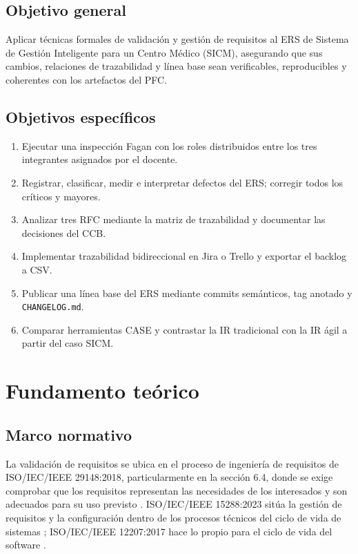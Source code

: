 \documentclass[11pt,a4paper]{article}
\newcommand{\sistema}{Sistema de Gestión Inteligente para un Centro Médico (SICM)}
\begin{document}
	\subsection{Objetivo general}
	Aplicar técnicas formales de validación y gestión de requisitos al ERS de \sistema, asegurando que sus cambios, relaciones de trazabilidad y línea base sean verificables, reproducibles y coherentes con los artefactos del PFC.
	
	\subsection{Objetivos específicos}
	\begin{enumerate}
		\item Ejecutar una inspección Fagan con los roles distribuidos entre los tres integrantes asignados por el docente.
		\item Registrar, clasificar, medir e interpretar defectos del ERS; corregir todos los críticos y mayores.
		\item Analizar tres RFC mediante la matriz de trazabilidad y documentar las decisiones del CCB.
		\item Implementar trazabilidad bidireccional en Jira o Trello y exportar el backlog a CSV.
		\item Publicar una línea base del ERS mediante commits semánticos, tag anotado y \texttt{CHANGELOG.md}.
		\item Comparar herramientas CASE y contrastar la IR tradicional con la IR ágil a partir del caso SICM.
	\end{enumerate}
	
	\section{Fundamento teórico}
	\subsection{Marco normativo}
	La validación de requisitos se ubica en el proceso de ingeniería de requisitos de ISO/IEC/IEEE 29148:2018, particularmente en la sección 6.4, donde se exige comprobar que los requisitos representan las necesidades de los interesados y son adecuados para su uso previsto \cite{iso29148}. ISO/IEC/IEEE 15288:2023 sitúa la gestión de requisitos y la configuración dentro de los procesos técnicos del ciclo de vida de sistemas \cite{iso15288}; ISO/IEC/IEEE 12207:2017 hace lo propio para el ciclo de vida del software \cite{iso12207}.
	
\end{document}
